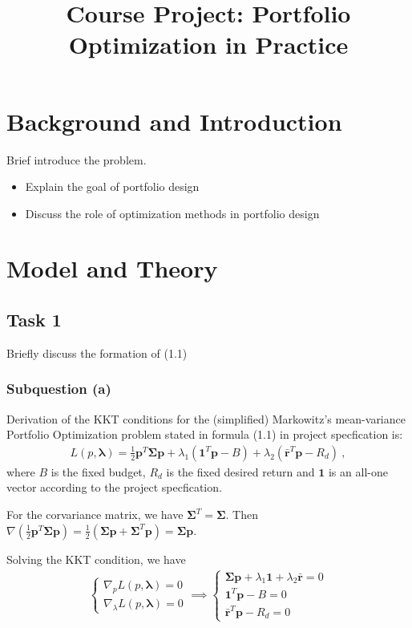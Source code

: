 \documentclass[12pt]{ftec2101}
\title{Course Project: Portfolio Optimization in Practice}
\newcommand{\vect}[1]{\mathbf{#1}}
\begin{document}
\maketitle


\section{Background and Introduction}
Brief introduce the problem.
\begin{itemize}
    \item Explain the goal of portfolio design
    \item Discuss the role of optimization methods in portfolio design
\end{itemize}
\section{Model and Theory}
\subsection{Task 1}
Briefly discuss the formation of (1.1)
\subsubsection{Subquestion (a)}
Derivation of the KKT conditions for the (simplified) Markowitz's mean-variance Portfolio Optimization problem stated in formula (1.1) in project specfication is:
\begin{align}
    L(p,\boldsymbol{\lambda}) = \frac{1}{2}\vect{p}^T\boldsymbol{\Sigma} \vect{p} + \lambda_{1} (\vect{1}^T \vect{p}-B) +\lambda_{2} (\bar{\vect{r}}^T \vect{p}-R_{d})\ ,
\end{align}
where $B$ is the fixed budget, $R_d$ is the fixed desired return and $\vect{1}$ is an all-one vector according to the project specfication.

\noindent
For the corvariance matrix, we have $\boldsymbol{\Sigma}^T = \boldsymbol{\Sigma}$. Then $\nabla \left(\frac{1}{2}\vect{p}^T \boldsymbol{\Sigma} \vect{p}\right) = \frac{1}{2}(\boldsymbol{\Sigma}\vect{p}+\boldsymbol{\Sigma}^T \vect{p}) = \boldsymbol{\Sigma}\vect{p}$. 

\noindent
Solving the KKT condition, we have
\begin{align}
    \begin{cases}
        \nabla_{p} L(p,\boldsymbol{\lambda}) = 0 \\
        \nabla_{\lambda} L(p,\boldsymbol{\lambda}) = 0
    \end{cases}
    \implies
    \begin{cases}
        \boldsymbol{\Sigma}\vect{p}+\lambda_1 \vect{1} + \lambda_2 \bar{\vect{r}} = 0 \\
        \vect{1}^T \vect{p} - B = 0 \\
        \bar{\vect{r}}^T \vect{p} - R_d = 0
    \end{cases}
    \label{KKT:1}
\end{align}
\end{document}

